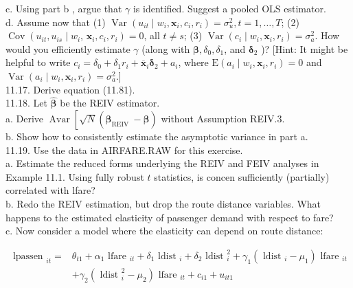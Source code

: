 \documentclass[10pt]{article}
\begin{document}
c. Using part b , argue that $\gamma$ is identified. Suggest a pooled OLS estimator.\\
d. Assume now that (1) $\operatorname{Var}\left(u_{i t} \mid w_{i}, \mathbf{x}_{i}, c_{i}, r_{i}\right)=\sigma_{u}^{2}, t=1, \ldots, T$; (2) $\operatorname{Cov}\left(u_{i t}, u_{i s} \mid w_{i}\right.$, $\left.\mathbf{x}_{i}, c_{i}, r_{i}\right)=0$, all $t \neq s$; (3) $\operatorname{Var}\left(c_{i} \mid w_{i}, \mathbf{x}_{i}, r_{i}\right)=\sigma_{a}^{2}$. How would you efficiently estimate $\gamma$ (along with $\boldsymbol{\beta}, \delta_{0}, \delta_{1}$, and $\boldsymbol{\delta}_{2}$ )? [Hint: It might be helpful to write $c_{i}=\delta_{0}+\delta_{1} r_{i}+ \overline{\mathbf{x}}_{i} \boldsymbol{\delta}_{2}+a_{i}$, where $\mathrm{E}\left(a_{i} \mid w_{i}, \mathbf{x}_{i}, r_{i}\right)=0$ and $\operatorname{Var}\left(a_{i} \mid w_{i}, \mathbf{x}_{i}, r_{i}\right)=\sigma_{a}^{2}$.]\\
11.17. Derive equation (11.81).\\
11.18. Let $\hat{\boldsymbol{\beta}}$ be the REIV estimator.\\
a. Derive $\operatorname{Avar}\left[\sqrt{N}\left(\hat{\boldsymbol{\beta}}_{\text {REIV }}-\boldsymbol{\beta}\right)\right.$ without Assumption REIV.3.\\
b. Show how to consistently estimate the asymptotic variance in part a.\\
11.19. Use the data in AIRFARE.RAW for this exercise.\\
a. Estimate the reduced forms underlying the REIV and FEIV analyses in Example 11.1. Using fully robust $t$ statistics, is concen sufficiently (partially) correlated with lfare?\\
b. Redo the REIV estimation, but drop the route distance variables. What happens to the estimated elasticity of passenger demand with respect to fare?\\
c. Now consider a model where the elasticity can depend on route distance:

$$
\begin{aligned}
\text { lpassen }_{i t}= & \theta_{t 1}+\alpha_{1} \text { lfare }_{i t}+\delta_{1} \text { ldist }_{i}+\delta_{2} \text { ldist }_{i}^{2}+\gamma_{1}\left(\text { ldist }_{i}-\mu_{1}\right) \text { lfare }_{i t} \\
& +\gamma_{2}\left(\text { ldist }_{i}^{2}-\mu_{2}\right) \text { lfare }_{i t}+c_{i 1}+u_{i t 1}
\end{aligned}
$$
\end{document}
